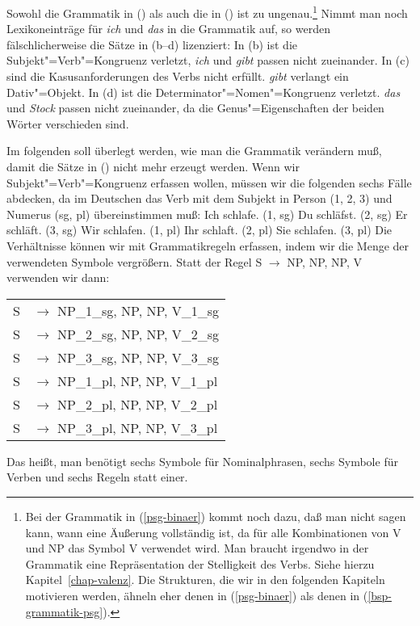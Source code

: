 \noindent
Sowohl die Grammatik in () als auch die in () ist zu ungenau.\footnote{
  Bei der Grammatik in (\ref{psg-binaer}) kommt noch dazu, daß man nicht sagen kann,
  wann eine Äußerung vollständig ist, da für alle Kombinationen von V und NP das Symbol
  V verwendet wird. Man braucht irgendwo in der Grammatik eine Repräsentation der Stelligkeit
  des Verbs. Siehe hierzu Kapitel~\ref{chap-valenz}. Die Strukturen, die wir in den folgenden
  Kapiteln motivieren werden, ähneln eher denen in (\ref{psg-binaer}) als denen in (\ref{bsp-grammatik-psg}).%
}
Nimmt man noch Lexikoneinträge für \emph{ich} und \emph{das} in die Grammatik auf, so werden
fälschlicherweise die Sätze in (b--d) lizenziert:
\eal
{}
\zl
In (b) ist die Subjekt"=Verb"=Kongruenz verletzt, \emph{ich} und \emph{gibt} passen
nicht zueinander. In (c) sind die Kasusanforderungen des Verbs nicht erfüllt.
\emph{gibt} verlangt ein Dativ"=Objekt. In (d) ist die Determinator"=Nomen"=Kongruenz
verletzt. \emph{das} und \emph{Stock} passen nicht zueinander, da die Genus"=Eigenschaften der
beiden Wörter verschieden sind.

Im folgenden soll überlegt werden, wie man die Grammatik verändern muß, damit die Sätze in ()
nicht mehr erzeugt werden. Wenn wir Subjekt"=Verb"=Kongruenz erfassen wollen, müssen
wir die folgenden sechs Fälle abdecken, da im Deutschen das Verb mit dem Subjekt in Person (1, 2, 3)
und Numerus (sg, pl) übereinstimmen muß:
\eal\jamwidth=8cm\relax
\ex Ich schlafe.  \jam(1, sg)
\ex Du schläfst.  \jam(2, sg)
\ex Er schläft.   \jam(3, sg)
\ex Wir schlafen. \jam(1, pl)
\ex Ihr schlaft.  \jam(2, pl)
\ex Sie schlafen. \jam(3, pl)
\zl
Die Verhältnisse können wir mit Grammatikregeln erfassen, indem wir die Menge der verwendeten
Symbole vergrößern. Statt der Regel S $\to$ NP, NP, NP, V verwenden wir dann:
\ea
\begin{tabular}[t]{@{}l@{ }l}
S  & $\to$ NP\_1\_sg, NP, NP, V\_1\_sg\\
S  & $\to$ NP\_2\_sg, NP, NP, V\_2\_sg\\
S  & $\to$ NP\_3\_sg, NP, NP, V\_3\_sg\\
S  & $\to$ NP\_1\_pl, NP, NP, V\_1\_pl\\
S  & $\to$ NP\_2\_pl, NP, NP, V\_2\_pl\\
S  & $\to$ NP\_3\_pl, NP, NP, V\_3\_pl\\
\end{tabular}
\z
Das heißt, man benötigt sechs Symbole für Nominalphrasen, sechs Symbole für Verben und 
sechs Regeln statt einer.

